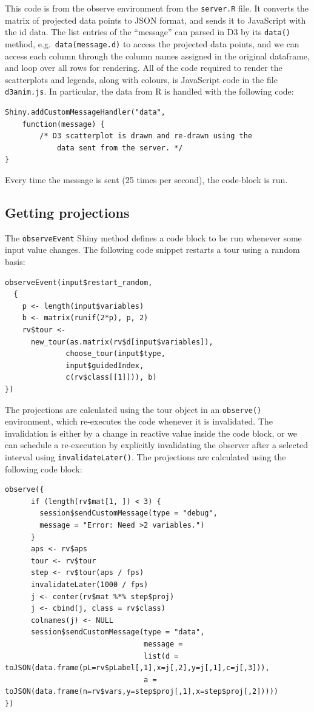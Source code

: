 This code is from the observe environment from the \texttt{server.R}
file. It converts the matrix of projected data points to JSON format,
and sends it to JavaScript with the id data. The list entries of the
``message'' can parsed in D3 by its \texttt{data()} method,
e.g.~\texttt{data(message.d)} to access the projected data points, and
we can access each column through the column names assigned in the
original dataframe, and loop over all rows for rendering. All of the
code required to render the scatterplots and legends, along with
colours, is JavaScript code in the file \texttt{d3anim.js}. In
particular, the data from R is handled with the following code:

\begin{verbatim}
Shiny.addCustomMessageHandler("data",
    function(message) {
        /* D3 scatterplot is drawn and re-drawn using the
            data sent from the server. */
}
\end{verbatim}

Every time the message is sent (25 times per second), the code-block is
run.

\hypertarget{getting-projections}{%
\subsection{Getting projections}\label{getting-projections}}

The \texttt{observeEvent} Shiny method defines a code block to be run
whenever some input value changes. The following code snippet restarts a
tour using a random basis:

\begin{verbatim}
observeEvent(input$restart_random,
  {
    p <- length(input$variables)
    b <- matrix(runif(2*p), p, 2)
    rv$tour <- 
      new_tour(as.matrix(rv$d[input$variables]),
              choose_tour(input$type, 
              input$guidedIndex,
              c(rv$class[[1]])), b)
})
\end{verbatim}

The projections are calculated using the tour object in an
\texttt{observe()} environment, which re-executes the code whenever it
is invalidated. The invalidation is either by a change in reactive value
inside the code block, or we can schedule a re-execution by explicitly
invalidating the observer after a selected interval using
\texttt{invalidateLater()}. The projections are calculated using the
following code block:

\begin{verbatim}
observe({
      if (length(rv$mat[1, ]) < 3) {
        session$sendCustomMessage(type = "debug",
        message = "Error: Need >2 variables.")
      }
      aps <- rv$aps
      tour <- rv$tour
      step <- rv$tour(aps / fps)
      invalidateLater(1000 / fps)
      j <- center(rv$mat %*% step$proj)
      j <- cbind(j, class = rv$class)
      colnames(j) <- NULL
      session$sendCustomMessage(type = "data",
                                message =
                                list(d = toJSON(data.frame(pL=rv$pLabel[,1],x=j[,2],y=j[,1],c=j[,3])),
                                a = toJSON(data.frame(n=rv$vars,y=step$proj[,1],x=step$proj[,2]))))
})
\end{verbatim}

